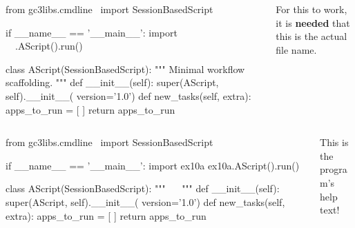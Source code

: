 \documentclass[english,serif,mathserif,xcolor=pdftex,dvipsnames,table]{beamer}
\begin{document}
\begin{frame}[fragile]
  \begin{columns}[t]
    \begin{column}{0.7\linewidth}
\begin{python}
from gc3libs.cmdline \
  import SessionBasedScript

if __name__ == '__main__':
  import ~~
  ~\HL{ex10a}~.AScript().run()

class AScript(SessionBasedScript):
  """
  Minimal workflow scaffolding.
  """
  def __init__(self):
    super(AScript, self).__init__(
        version='1.0')
  def new_tasks(self, extra):
    apps_to_run = [ ]
    return apps_to_run
\end{python}
    \end{column}
    \begin{column}{0.4\linewidth}
      \begin{flushright}
        For this to work, it is \textbf{needed} that this is the
        actual file name.
      \end{flushright}
    \end{column}
  \end{columns}
\end{frame}


\begin{frame}[fragile]
  \begin{columns}
    \begin{column}{0.7\linewidth}
\begin{python}
from gc3libs.cmdline \
  import SessionBasedScript

if __name__ == '__main__':
  import ex10a
  ex10a.AScript().run()

class AScript(SessionBasedScript):
  """
  ~~
  """
  def __init__(self):
    super(AScript, self).__init__(
        version='1.0')
  def new_tasks(self, extra):
    apps_to_run = [ ]
    return apps_to_run
\end{python}
    \end{column}
    \begin{column}{0.4\linewidth}
      \begin{flushright}
        This is the \\ program's help text!
      \end{flushright}
    \end{column}
  \end{columns}
\end{frame}
\end{document}
